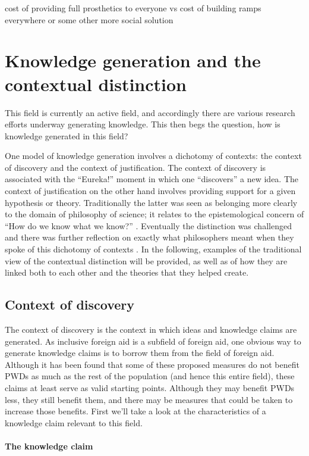\documentclass[a4paper]{article}
\begin{document}
cost of providing full prosthetics to everyone vs cost of building ramps
everywhere or some other more social solution


\newpage
\section{Knowledge generation and the contextual distinction}

This field is currently an active field, and accordingly there are various
research efforts underway generating knowledge. This then begs the question,
how is knowledge generated in this field?  


One model of knowledge generation involves a dichotomy of contexts: the
context of discovery and the context of justification. The context of
discovery is associated with the ``Eureka!'' moment in which one ``discovers''
a new idea. The context of justification on the other hand involves providing
support for a given hypothesis or theory. Traditionally the latter was seen as
belonging more clearly to the domain of philosophy of science; it relates to
the epistemological concern of ``How do we know what we know?''
\citep{schickore2014scientific}. Eventually the distinction was challenged and
there was further reflection on exactly what philosophers meant when they
spoke of this dichotomy of contexts \citep{hoyningen2006context}. In the
following, examples of the traditional view of the contextual distinction will
be provided, as well as of how they are linked both to each other and the
theories that they helped create.

\subsection{Context of discovery}

The context of discovery is the context in which ideas and knowledge claims
are generated. As inclusive foreign aid is a subfield of foreign aid, one
obvious way to generate knowledge claims is to borrow them from the field of
foreign aid. Although it has been found that some of these proposed measures
do not benefit PWDs as much as the rest of the population (and hence this
entire field), these claims at least serve as valid starting points. Although
they may benefit PWDs less, they still benefit them, and there may be measures
that could be taken to increase those benefits. First we'll take a look at the
characteristics of a knowledge claim relevant to this field.


\paragraph{The knowledge claim}
\end{document}
